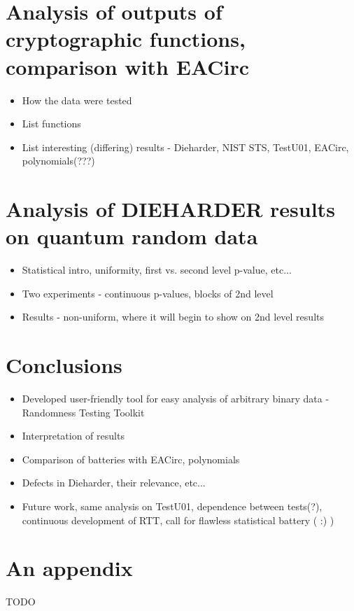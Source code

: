 \documentclass[
  digital,  	%
  color,		%
  oneside,   	%
  12pt,
  nocover,
  table,
  nolof,
  nolot,
]{fithesis3}
\begin{document}
\chapter{Analysis of outputs of cryptographic functions, comparison with EACirc}
\begin{itemize}
\item How the data were tested
\item List functions
\item List interesting (differing) results - Dieharder, NIST STS, TestU01, EACirc, polynomials(???)
\end{itemize}

\chapter{Analysis of DIEHARDER results on quantum random data}
\begin{itemize}
\item Statistical intro, uniformity, first vs. second level p-value, etc...
\item Two experiments - continuous p-values, blocks of 2nd level
\item Results - non-uniform, where it will begin to show on 2nd level results
\end{itemize}

\chapter{Conclusions}
\begin{itemize}
\item Developed user-friendly tool for easy analysis of arbitrary binary data - Randomness Testing Toolkit
\item Interpretation of results
\item Comparison of batteries with EACirc, polynomials
\item Defects in Dieharder, their relevance, etc...
\item Future work, same analysis on TestU01, dependence between tests(?), continuous development of RTT, call for flawless statistical battery ( :) )
\end{itemize}

\appendix

\printbibliography

\chapter{An appendix}
\begin{huge}
TODO
\end{huge}
\end{document}
